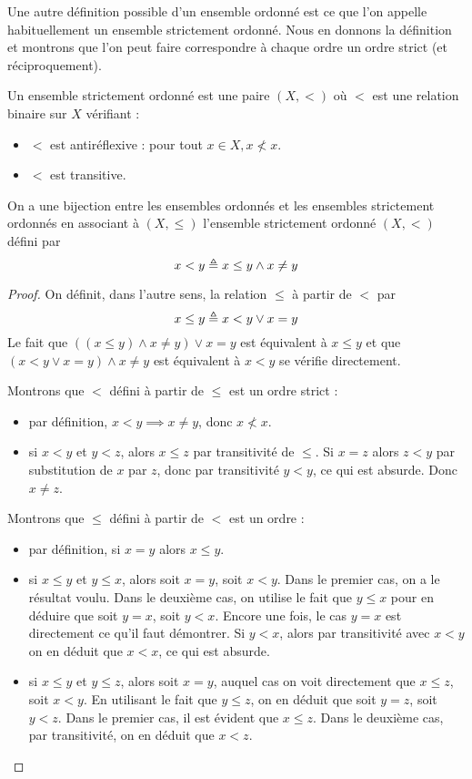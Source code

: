 Une autre définition possible d'un ensemble ordonné est ce que l'on appelle
habituellement un ensemble strictement ordonné. Nous en donnons la définition et
montrons que l'on peut faire correspondre à chaque ordre un ordre strict (et
réciproquement).

\begin{definition}
  Un ensemble strictement ordonné est une paire $(X,<)$ où $<$ est une relation
  binaire sur $X$ vérifiant :
  \begin{itemize}
  \item $<$ est antiréflexive : pour tout $x\in X, x\not< x$.
  \item $<$ est transitive.
  \end{itemize}
\end{definition}

\begin{proposition}
  On a une bijection entre les ensembles ordonnés et les ensembles strictement
  ordonnés en associant à $(X,\leq)$ l'ensemble strictement ordonné $(X,<)$
  défini par
  \[x < y \triangleq x \leq y \land x \neq y\]
\end{proposition}

\begin{proof}
  On définit, dans l'autre sens, la relation $\leq$ à partir de $<$ par
  \[x\leq y \triangleq x < y \lor x = y\]
  Le fait que $((x \leq y)\land x \neq y) \lor x = y$ est équivalent à $x\leq y$
  et que $(x < y\lor x = y) \land x \neq y$ est équivalent à $x < y$ se vérifie
  directement.

  Montrons que $<$ défini à partir de $\leq$ est un ordre strict :
  \begin{itemize}
  \item par définition, $x < y\implies x \neq y$, donc $x\not< x$.
  \item si $x < y$ et $y < z$, alors $x \leq z$ par transitivité de $\leq$.
    Si $x = z$ alors $z < y$ par substitution de $x$ par $z$, donc par
    transitivité $y < y$, ce qui est absurde. Donc $x \neq z$.
  \end{itemize}

  Montrons que $\leq$ défini à partir de $<$ est un ordre :
  \begin{itemize}
  \item par définition, si $x = y$ alors $x\leq y$.
  \item si $x\leq y$ et $y\leq x$, alors soit $x = y$, soit $x < y$. Dans le
    premier cas, on a le résultat voulu. Dans le deuxième cas, on utilise le
    fait que $y\leq x$ pour en déduire que soit $y = x$, soit $y < x$. Encore
    une fois, le cas $y = x$ est directement ce qu'il faut démontrer.
    Si $y < x$, alors par transitivité avec $x < y$ on en déduit que $x < x$,
    ce qui est absurde.
  \item si $x \leq y$ et $y \leq z$, alors soit $x = y$, auquel cas on voit
    directement que $x\leq z$, soit $x < y$. En utilisant le fait que $y \leq z$,
    on en déduit que soit $y = z$, soit $y < z$. Dans le premier cas, il est
    évident que $x \leq z$. Dans le deuxième cas, par transitivité, on en déduit
    que $x < z$.
  \end{itemize}
\end{proof}

